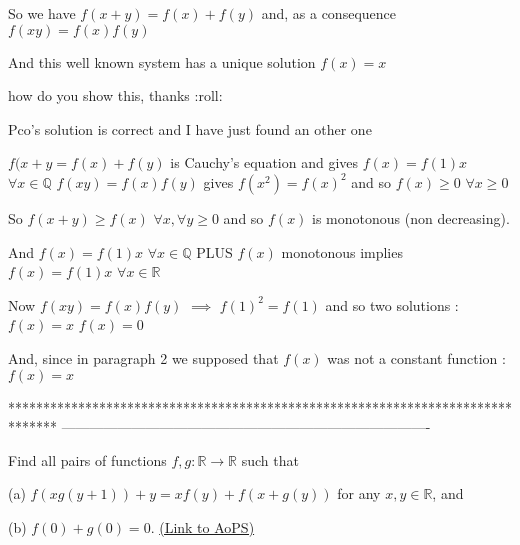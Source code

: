 \begin{mysolution}
	\begin{tcolorbox}

So we have $ f(x + y) = f(x) + f(y)$ and, as a consequence $ f(xy) = f(x)f(y)$

And this well known system has a unique solution $ f(x) = x$
\end{tcolorbox}

how do you show this, thanks :roll:
\end{mysolution}



\begin{mysolution}
	\begin{italicized}Pco's solution is correct and I have just found an other one  \end{italicized}
\end{mysolution}



\begin{mysolution}


$ f(x+y=f(x)+f(y)$ is Cauchy's equation and gives $ f(x)=f(1)x$ $ \forall x\in\mathbb Q$
$ f(xy)=f(x)f(y)$ gives $ f(x^2)=f(x)^2$ and so $ f(x)\geq 0$ $ \forall x\geq 0$

So $ f(x+y)\geq f(x)$ $ \forall x,\forall y\geq 0$ and so $ f(x)$ is monotonous (non decreasing).

And  $ f(x)=f(1)x$ $ \forall x\in\mathbb Q$ PLUS  $ f(x)$  monotonous implies $ f(x)=f(1)x$ $ \forall x\in\mathbb R$

Now $ f(xy)=f(x)f(y)$ $ \implies$ $ f(1)^2=f(1)$ and so two solutions :
$ f(x)=x$
$ f(x)=0$

And, since in paragraph 2 we supposed that $ f(x)$ was not a constant function : $ f(x)=x$
\end{mysolution}
*******************************************************************************
-------------------------------------------------------------------------------

\begin{problem}
	Find all pairs of functions $ f,g: \mathbb R\rightarrow \mathbb R$ such that

(a) $ f(xg(y+1))+y=xf(y)+f(x+g(y))$ for any $ x,y\in \mathbb R$, and

(b) $ f(0)+g(0)=0$.
	\flushright \href{https://artofproblemsolving.com/community/c6h179588}{(Link to AoPS)}
\end{problem}



